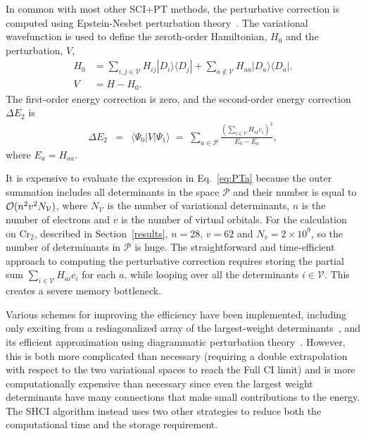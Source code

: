 \documentclass[%
reprint,
 superscriptaddress,
 amsmath,amssymb,
 aps,
]{revtex4-1}
\def\beq{\begin{eqnarray}}
\def\eeq{\end{eqnarray}}
\def\V{\mathcal{V}}
\def\P{\mathcal{P}}
\begin{document}
In common with most other SCI+PT methods, the perturbative correction is
computed using Epstein-Nesbet perturbation theory~\cite{Eps-PR-26,Nes-PRS-55}.
The variational wavefunction is used to define the zeroth-order Hamiltonian, $H_0$ and the perturbation, $V$,
\begin{align}
H_0 &= \sum_{i,j \in \V} H_{ij} |D_i\rangle\langle D_j| + \sum_{a \notin \V } H_{aa} |D_a\rangle\langle D_a|. \nonumber\\
V &= H - H_0 . \label{eq:part}
\end{align}
The first-order energy correction is zero, and the second-order energy correction $\Delta E_{2}$ is
\beq
 \Delta E_{2} &=& \langle\Psi_0|V|\Psi_1\rangle
 \;=\; \sum_{a \in \P} \frac{\left(\sum_{i \in \V} H_{ai} c_i\right)^2}{E_0 - E_a},
\label{eq:PTa}
\eeq
where $E_a=H_{aa}$.

It is expensive to evaluate the expression in Eq.~\ref{eq:PTa} because the outer summation includes all determinants in the space $\P$ and their number is equal to 
${\cal O}(n^2v^2N_\V)$, where $N_\V$ is the number of variational determinants, $n$ is the number of electrons and $v$ is
the number of virtual orbitals. For the calculation on Cr$_2$, described in Section~\ref{results},
$n=28$, $v=62$ and $N_v=2 \times 10^9$, so the number of determinants in $\P$ is huge.
The straightforward
and time-efficient approach to computing the perturbative correction requires storing
the partial sum $\sum_{i \in \V} H_{ai} c_i$ for each $a$, while
looping over all the determinants $i\in\V$. This creates a severe memory bottleneck.

Various schemes for improving the efficiency have been implemented, including only exciting from
a rediagonalized array of the largest-weight determinants~\cite{EvaDauMal-CP-83}, and its efficient approximation using
diagrammatic perturbation theory~\cite{CimPer-JCoP-87}.
However, this is both more complicated than necessary (requiring a double extrapolation with respect to the two
variational spaces to reach the Full CI limit) and is more computationally expensive than necessary since even
the largest weight determinants have many connections that make small contributions to the energy.
The SHCI algorithm instead uses two other strategies to reduce both the computational time and the storage requirement.
\end{document}
